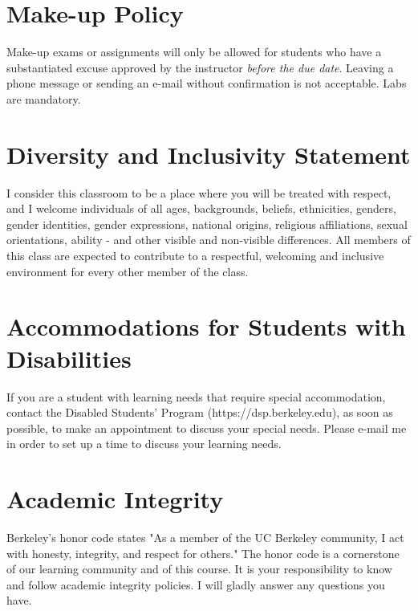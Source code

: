 \documentclass[letterpaper]{inzane_syllabus} %
\begin{document}
\newpage %

\makeSide %


\vspace{0.5cm}
\section{Make-up Policy}

Make-up exams or assignments will only be allowed for students who have a substantiated excuse approved by the instructor \emph{before the due date}. Leaving a phone message or sending an e-mail without confirmation is not acceptable. Labs are mandatory.

\vspace{0.5cm}
\section{Diversity and Inclusivity Statement}

I consider this classroom to be a place where you will be treated with respect, and I welcome individuals of all ages, backgrounds, beliefs, ethnicities, genders, gender identities, gender expressions, national origins, religious affiliations, sexual orientations, ability - and other visible and non-visible differences. All members of this class are expected to contribute to a respectful, welcoming and inclusive environment for every other member of the class. 

\vspace{0.5cm}
\section{Accommodations for Students with Disabilities}

If you are a student with learning needs that require special accommodation, contact the Disabled Students' Program (https://dsp.berkeley.edu), as soon as possible, to make an appointment to discuss your special needs.  Please e-mail me in order to set up a time to discuss your learning needs.

\vspace{0.5cm}
\section{Academic Integrity}

Berkeley's honor code states "As a member of the UC Berkeley community, I act with honesty, integrity, and respect for others." The honor code is a cornerstone of our learning community and of this course. It is your responsibility to know and follow academic integrity policies. I will gladly answer any questions you have.\\
\end{document}
